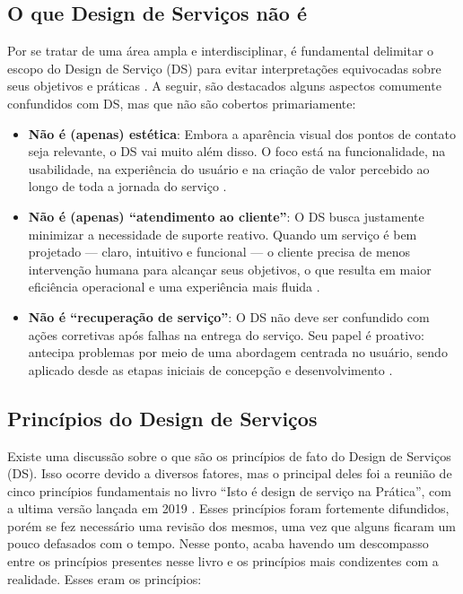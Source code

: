 \subsection{O que Design de Serviços não é}

Por se tratar de uma área ampla e interdisciplinar, é fundamental delimitar o escopo do Design de Serviço (DS) para evitar interpretações equivocadas sobre seus objetivos e práticas \cite{Polaine2013Orange}. A seguir, são destacados alguns aspectos comumente confundidos com DS, mas que não  são cobertos primariamente:

\begin{itemize}
	\item \textbf{Não é (apenas) estética}:  Embora a aparência visual dos pontos de contato seja relevante, o DS vai muito além disso. O foco está na funcionalidade, na usabilidade, na experiência do usuário e na criação de valor percebido ao longo de toda a jornada do serviço \cite{Polaine2013Orange}.
	
	\item \textbf{Não é (apenas) ``atendimento ao cliente''}: O DS busca justamente minimizar a necessidade de suporte reativo. Quando um serviço é bem projetado — claro, intuitivo e funcional — o cliente precisa de menos intervenção humana para alcançar seus objetivos, o que resulta em maior eficiência operacional e uma experiência mais fluida \cite{Stickdorn2019}.
	
	\item \textbf{Não é ``recuperação de serviço''}: O DS não deve ser confundido com ações corretivas após falhas na entrega do serviço. Seu papel é proativo: antecipa problemas por meio de uma abordagem centrada no usuário, sendo aplicado desde as etapas iniciais de concepção e desenvolvimento \cite{Patricio2011Multilevel}.
\end{itemize}


\subsection{Princípios do Design de Serviços}

Existe uma discussão sobre o que são os princípios de fato do Design de Serviços (DS). Isso ocorre devido a diversos fatores, mas o principal deles foi a reunião de cinco princípios fundamentais no livro ``Isto é design de serviço na Prática'', com a ultima versão lançada em 2019 \cite{Stickdorn2019}. Esses princípios foram fortemente difundidos, porém se fez necessário uma revisão dos mesmos, uma vez que alguns ficaram um pouco defasados com o tempo. Nesse ponto, acaba havendo um descompasso entre os princípios presentes nesse livro e os princípios mais condizentes com a realidade. Esses eram os princípios:

